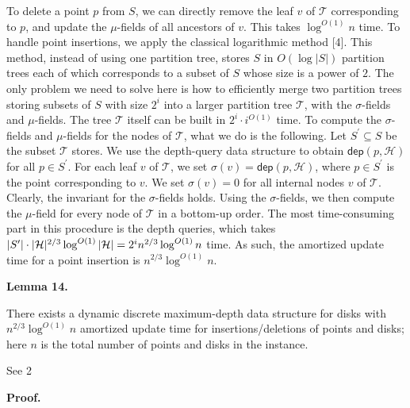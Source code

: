 \documentclass[10pt,a4paper]{article}
\begin{document}
To delete a point $p$ from $S$, we can directly remove the leaf $v$ of $\mathcal{T}$ corresponding to $p$, and update the $\mu$-fields of all ancestors of $v$. This takes $\log^{O(1)}n$ time. To handle point insertions, we apply the classical logarithmic method [4]. This method, instead of using one partition tree, stores $S$ in $O(\log|S|)$ partition trees each of which corresponds to a subset of $S$ whose size is a power of $2$. The only problem we need to solve here is how to efficiently merge two partition trees storing subsets of $S$ with size $2^{i}$ into a larger partition tree $\mathcal{T}$, with the $\sigma$-fields and $\mu$-fields. The tree $\mathcal{T}$ itself can be built in $2^{i}\cdot i^{O(1)}$ time. To compute the $\sigma$-fields and $\mu$-fields for the nodes of $\mathcal{T}$, what we do is the following. Let $S^{\prime}\subseteq S$ be the subset $\mathcal{T}$ stores. We use the depth-query data structure to obtain $\mathsf{dep}(p,\mathcal{H})$ for all $p\in S^{\prime}$. For each leaf $v$ of $\mathcal{T}$, we set $\sigma(v)=\mathsf{dep}(p,\mathcal{H})$, where $p\in S^{\prime}$ is the point corresponding to $v$. We set $\sigma(v)=0$ for all internal nodes $v$ of $\mathcal{T}$. Clearly, the invariant for the $\sigma$-fields holds. Using the $\sigma$-fields, we then compute the $\mu$-field for every node of $\mathcal{T}$ in a bottom-up order. The most time-consuming part in this procedure is the depth queries, which takes $|S^{\prime}|\cdot|\mathcal{H}|^{2/3}\log^{O(1)}|\mathcal{H}|=2^{i}n^{2/3}\log^%
{O(1)}n$ time. As such, the amortized update time for a point insertion is $n^{2/3}\log^{O(1)}n$.
\par
\par
\par\medskip\noindent\textbf{Lemma 14.}\par
There exists a dynamic discrete maximum-depth data structure for disks with $n^{2/3}\log^{O(1)}n$ amortized update time for insertions/deletions of points and disks; here $n$ is the total number of points and disks in the instance.
\par
\par
\par
See 2
\par
\par
\par\medskip\noindent\textbf{Proof.}\par
\end{document}
